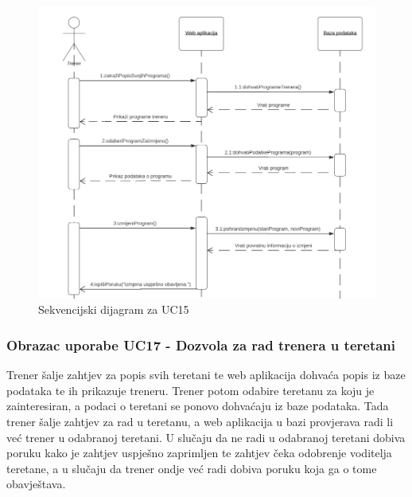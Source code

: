                     \begin{figure}[H]
			            \includegraphics[scale=0.9]{slike/UC15.PNG} %
			            \centering
			            \caption{Sekvencijski dijagram za UC15}
			            \label{fig:promjene}
		            \end{figure}
                    
                    
                    \subsubsection{Obrazac uporabe UC17 - Dozvola za rad trenera u teretani}
					\textit{}Trener šalje zahtjev za popis svih teretani te web aplikacija dohvaća popis
                    iz baze podataka te ih prikazuje treneru. Trener potom odabire teretanu za 
                    koju je zainteresiran, a podaci o teretani se ponovo dohvaćaju iz baze podataka.
                    Tada trener šalje zahtjev za rad u teretanu, a web aplikacija u bazi provjerava
                    radi li već trener u odabranoj teretani. U slučaju da ne radi u odabranoj teretani
                    dobiva poruku kako je zahtjev uspješno zaprimljen te zahtjev čeka odobrenje voditelja
                    teretane, a u slučaju da trener ondje već radi dobiva poruku koja ga o tome obavještava.\\
                    
